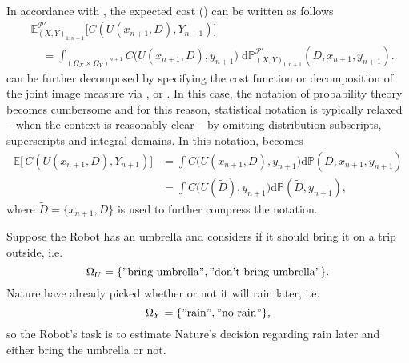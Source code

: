 \begin{remark}
	\label{rem:notation}
	In accordance with , the expected cost () can be written as follows
	\begin{equation}
		\begin{split}
			&\mathbb{E}_{(X,Y)_{1\colon n+1}}^{\mathcal{P}'}\big[C(U(x_{n+1},D),Y_{n+1})\big] \\
			&\quad= \int_{(\Omega_X\times\Omega_Y)^{n+1}}
			C\big(U(x_{n+1},D),y_{n+1}\big)\;
			\mathrm{d}\mathbb{P}_{(X,Y)_{1\colon n+1}}^{\mathcal{P}'}(D,x_{n+1},y_{n+1}).
		\end{split}
		\label{eq:expcost2}
	\end{equation}
	 can be further decomposed by specifying the cost function or decomposition of the joint image measure via ,  or . In this case, the notation of probability theory becomes cumbersome and for this reason, statistical notation is typically relaxed -- when the context is reasonably clear -- by omitting distribution subscripts, superscripts and integral domains. In this notation,  becomes
	\begin{equation}
		\begin{split}
			\mathbb{E}\big[\,C(U(x_{n+1},D) ,Y_{n+1})\big] &= \int C\big(U(x_{n+1},D),y_{n+1}\big) \mathrm{d}\mathbb{P}(D,x_{n+1},y_{n+1})\\
			&= \int C\big(U(\tilde{D}),y_{n+1}\big) \mathrm{d}\mathbb{P}(\tilde{D},y_{n+1}),
		\end{split}
		\label{eq:expcost3}
	\end{equation}	
	where $\tilde{D}= \{x_{n+1},D\}$ is used to further compress the notation.
\end{remark}

\begin{example}
	\label{ex:rain}
	Suppose the Robot has an umbrella and considers if it should bring it on a trip outside, i.e.
	\begin{equation}
		\Omega_U = \{"\text{bring umbrella}", "\text{don't bring umbrella}"\}.
	\end{equation}
	Nature have already picked whether or not it will rain later, i.e.
	\begin{equation}
		\Omega_Y = \{"\text{rain}", "\text{no rain}"\},
	\end{equation}
	so the Robot's task is to estimate Nature's decision regarding rain later and either bring the umbrella or not.
\end{example}

